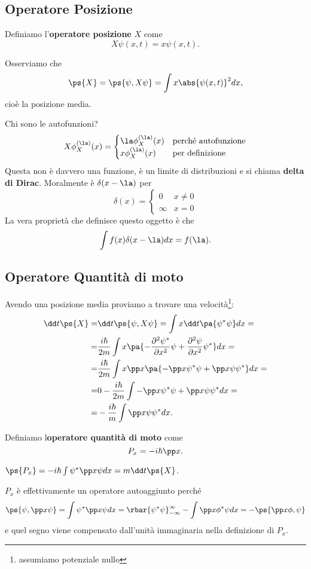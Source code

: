 \subsection{Operatore Posizione}

\begin{definition}
Definiamo l'\textbf{operatore posizione} $X$ come
\[X\psi(x,t)=x\psi(x,t).\]
\end{definition}
Osserviamo che
\[\ps{X}=\ps{\psi,X\psi}=\int x\abs{\psi(x,t)}^2dx,\]
cio\`e la posizione media.\bigskip

\noindent Chi sono le autofunzioni?
\[X\phi_X^{(\la)}(x)=
\begin{cases}
\la \phi_X^{(\la)}(x) &\text{perch\'e autofunzione}\\
x\phi_X^{(\la)}(x) &\text{per definizione}
\end{cases}\]
Questa non \`e davvero una funzione, \`e un limite di distribuzioni e si chiama \textbf{delta di Dirac}. Moralmente \`e $\delta(x-\la)$ per 
\[\delta(x)=\begin{cases}
0 &x\neq 0\\
\infty &x=0
\end{cases}\]
La vera propriet\`a che definisce questo oggetto \`e che
\[\int f(x)\delta(x-\la)dx=f(\la).\]

\subsection{Operatore Quantit\`a di moto}
\noindent Avendo una posizione media proviamo a trovare una velocit\`a\footnote{assumiamo potenziale nullo}:
\begin{align*}
\dd t{}\ps{X}=&\dd t{}\ps{\psi,X\psi}=\int x\dd t{}\pa{\psi^\ast\psi}dx=\\
=&\frac{i\hbar}{2m}\int x\pa{-\pps[2] x{\psi^\ast}\psi+\pps[2] x{\psi}\psi^\ast}dx=\\
=&\frac{i\hbar}{2m}\int x\pp x{}\pa{-\pp x{\psi^\ast}\psi+\pp x{\psi}\psi^\ast}dx=\\
=&0-\frac{i\hbar}{2m}\int-\pp x{\psi^\ast}\psi+\pp x{\psi}\psi^\ast dx=\\
=&-\frac{i\hbar}{m}\int\pp x{\psi}\psi^\ast dx.
\end{align*}
\begin{definition}
Definiamo l\textbf{operatore quantit\`a di moto} come
\[P_x=-i\hbar \pp x{}.\]
\end{definition}
\begin{remark}
$\ps{P_x}=-i\hbar\int \psi^\ast\pp x\psi dx=m\dd t{}\ps{X}$.
\end{remark}
\begin{remark}
$P_x$ \`e effettivamente un operatore autoaggiunto perch\'e
\[\ps{\psi,\pp x\psi}=\int\psi^\ast\pp x\psi dx=\rbar{\psi^\ast\psi}^\infty_{-\infty}-\int \pp x{\phi^\ast}\psi dx=-\ps{\pp x\phi,\psi}\]
e quel segno viene compensato dall'unit\`a immaginaria nella definizione di $P_x$.
\end{remark}

